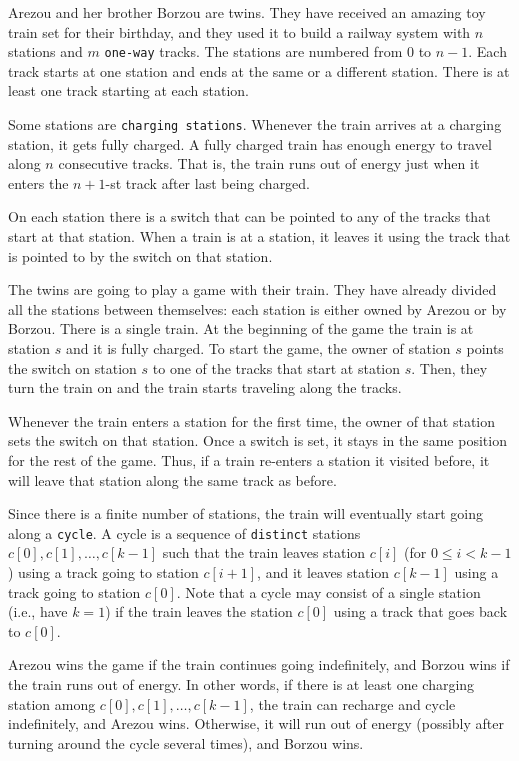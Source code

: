Arezou and her brother Borzou are twins. They have received an amazing toy train set for their birthday, and they used it to build a railway system with $n$ stations and $m$ \texttt{one-way} tracks. The stations are numbered from $0$ to $n - 1$. Each track starts at one station and ends at the same or a different station. There is at least one track starting at each station.

Some stations are \texttt{charging stations}. Whenever the train arrives at a charging station, it gets fully charged. A fully charged train has enough energy to travel along $n$ consecutive tracks. That is, the train runs out of energy just when it enters the $n + 1$-st track after last being charged.

On each station there is a switch that can be pointed to any of the tracks that start at that station. When a train is at a station, it leaves it using the track that is pointed to by the switch on that station.

The twins are going to play a game with their train. They have already divided all the stations between themselves: each station is either owned by Arezou or by Borzou.
There is a single train. At the beginning of the game the train is at station $s$ and it is fully charged. To start the game, the owner of station $s$ points the switch on station $s$ to one of the tracks that start at station $s$. Then, they turn the train on and the train starts traveling along the tracks.

Whenever the train enters a station for the first time, the owner of that station sets the switch on that station. Once a switch is set, it stays in the same position for the rest of the game. Thus, if a train re-enters a station it visited before, it will leave that station along the same track as before.

Since there is a finite number of stations, the train will eventually start going along a \texttt{cycle}. A cycle is a sequence of \texttt{distinct} stations $c[0], c[1], \ldots, c[k - 1]$ such that the train leaves station $c[i]$ (for $0 \le i < k - 1$) using a track going to station $c[i + 1]$, and it leaves station $c[k - 1]$ using a track going to station $c[0]$. Note that a cycle may consist of a single station (i.e., have $k = 1$) if the train leaves the station $c[0]$ using a track that goes back to $c[0]$.

Arezou wins the game if the train continues going indefinitely, and Borzou wins if the train runs out of energy. In other words, if there is at least one charging station among $c[0], c[1], \ldots, c[k - 1]$, the train can recharge and cycle indefinitely, and Arezou wins. Otherwise, it will run out of energy (possibly after turning around the cycle several times), and Borzou wins.

